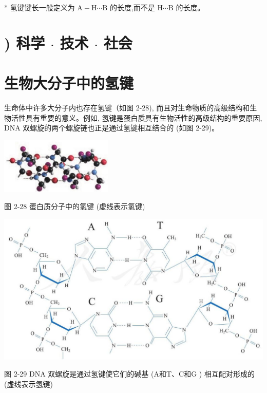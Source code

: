 \documentclass[10pt]{article}
\begin{document}
* 氢键键长一般定义为 \(\mathrm{A} - \mathrm{H}\cdots \mathrm{B}\) 的长度,而不是 \(\mathrm{H}\cdots \mathrm{B}\) 的长度。

\section*{) 科学 \(\cdot\) 技术 \(\cdot\) 社会}

\section*{生物大分子中的氢键}

生命体中许多大分子内也存在氢键（如图 2-28), 而且对生命物质的高级结构和生物活性具有重要的意义。例如, 氢键是蛋白质具有生物活性的高级结构的重要原因, DNA 双螺旋的两个螺旋链也正是通过氢键相互结合的 (如图 2-29)。

\begin{center}
\includegraphics[max width=0.4\textwidth]{images/0190e026-5a11-7df7-bd27-54d09026ba7a_61_290934.jpg}
\end{center}

图 2-28 蛋白质分子中的氢键 (虚线表示氢键)

\begin{center}
\includegraphics[max width=1.0\textwidth]{images/0190e026-5a11-7df7-bd27-54d09026ba7a_61_582870.jpg}
\end{center}

图 2-29 DNA 双螺旋是通过氢键使它们的碱基 (A和T、C和G ) 相互配对形成的 (虚线表示氢键)
\end{document}
